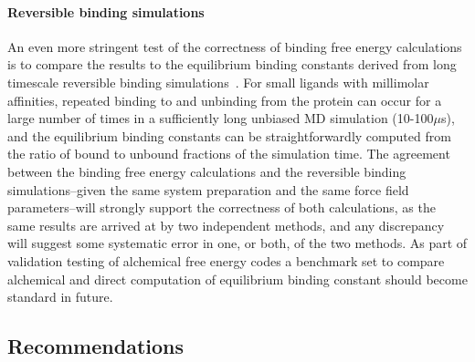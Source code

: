 \documentclass[9pt,bestpractices]{livecoms}
\begin{document}
%
\paragraph{Reversible binding simulations}
An even more stringent test of the correctness of binding free energy calculations is to compare the results to the equilibrium binding constants derived from long timescale reversible binding simulations~\cite{pan2017quantitative}.  For small ligands with millimolar affinities, repeated binding to and unbinding from the protein can occur for a large number of times in a sufficiently long unbiased MD simulation (10-100$\mu$s), and the equilibrium binding constants can be straightforwardly computed from the ratio of bound to unbound fractions of the simulation time. The agreement between the binding free energy calculations and the reversible binding simulations--given the same system preparation and the same force field parameters--will strongly support the correctness of both calculations, as the same results are arrived at by two independent methods, and any discrepancy will suggest some systematic error in one, or both, of the two methods. As part of validation testing of alchemical free energy codes a benchmark set to compare alchemical and direct computation of equilibrium binding constant should become standard in future.
%
\subsection{Recommendations}
\end{document}
